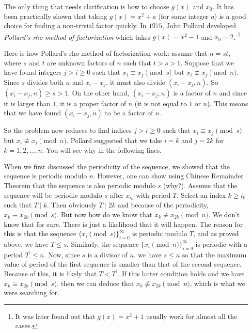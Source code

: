 The only thing that needs clarification is how to choose $g(x)$ and $x_0$. It has been practically shown that taking $g(x)=x^2+a$ (for some integer $a$) is a good choice for finding a non-trivial factor quickly.
In $1975$, John Pollard developed \emph{Pollard's rho method of factorization} which takes $g(x)=x^2-1$ and $x_0=2$. \footnote{It was later found out that $g(x)=x^2+1$ usually work for almost all the cases.}

Here is how Pollard's rho method of factorization work: assume that $n=st$, where $s$ and $t$ are unknown factors of $n$ such that $t>s>1$. Suppose that we have found integers $j>i\geq 0$ such that $x_i \equiv x_j \pmod s$ but $x_i \not \equiv x_j \pmod n$. Since $s$ divides both $n$ and $x_i-x_j$, it must also divide $(x_i-x_j, n)$. So $(x_i-x_j, n) \geq s >1$. On the other hand, $(x_i-x_j, n)$ is a factor of $n$ and since it is larger than $1$, it is a proper factor of $n$ (it is not equal to $1$ or $n$). This means that we have found $(x_i-x_j, n)$ to be a factor of $n$.

So the problem now reduces to find indices $j>i \geq 0$ such that $x_i \equiv x_j \pmod s$ but $x_i \not \equiv x_j \pmod n$. Pollard suggested that we take $i=k$ and $j=2k$ for $k=1,2,\ldots, n$. You will see why in the following lines.

When we first discussed the periodicity of the sequence, we showed that the sequence is periodic modulo $n$. However, one can show using Chinese Remainder Theorem that the sequence is also periodic modulo $s$ (why?). Assume that the sequence will be periodic modulo $s$ after $x_{i_0}$ with period $T$. Select an index $k \geq i_0$ such that $T\mid k$. Then obviously $T\mid 2k$ and because of the periodicity, $x_{k} \equiv x_{2k} \pmod s$. But now how do we know that $x_{k} \not \equiv x_{2k} \pmod n$. We don't know that for sure. There is just a likelihood that it will happen. The reason for this is that the sequence $\{x_i \pmod s\}_{i=0}^{\infty}$ is periodic modulo $T$, and as proved above, we have $T \leq s$. Similarly, the sequence $\{x_i \pmod n\}_{i=0}^{\infty}$ is periodic with a period $T^{\prime} \leq n$. Now, since $s$ is a divisor of $n$, we have $s \leq n$ so that the maximum value of period of the first sequence is smaller than that of the second sequence. Because of this, it is likely that $T<T^{\prime}$. If this latter condition holds and we have $x_{k}\equiv x_{2k} \pmod s$, then we can deduce that $x_k \not \equiv x_{2k} \pmod n$, which is what we were searching for.

